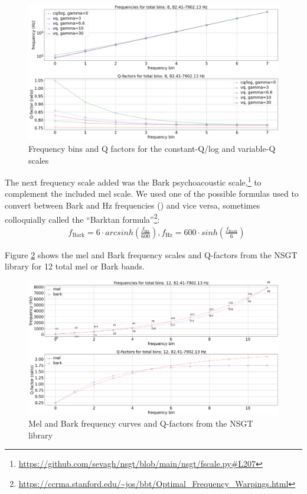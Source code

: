 \documentclass[report.tex]{subfiles}
\begin{document}
\begin{figure}[ht]
	\centering
	\includegraphics[width=\textwidth]{./images-freqscales/vqlog.png}
	\caption{Frequency bins and Q factors for the constant-Q/log and variable-Q scales}
	\label{fig:vq}
\end{figure}

The next frequency scale added was the Bark psychoacoustic scale,\footnote{\url{https://github.com/sevagh/nsgt/blob/main/nsgt/fscale.py\#L207}} to complement the included mel scale. We used one of the possible formulas used to convert between Bark and Hz frequencies (\cite{barktan}) and vice versa, sometimes colloquially called the ``Barktan formula''\footnote{\url{https://ccrma.stanford.edu/~jos/bbt/Optimal_Frequency_Warpings.html}}:
\begin{align}
	\nonumber & f_{\text{Bark}} = 6 \cdot arcsinh(\frac{f_{\text{Hz}}}{600}), f_{\text{Hz}} = 600 \cdot sinh(\frac{f_{\text{Bark}}}{6})
\end{align}

Figure \ref{fig:melbarkfsandqs} shows the mel and Bark frequency scales and Q-factors from the NSGT library for 12 total mel or Bark bands.

\begin{figure}[ht]
	\centering
	\includegraphics[width=\textwidth]{./images-freqscales/melbarkpitchesqs.png}
	\caption{Mel and Bark frequency curves and Q-factors from the NSGT library}
	\label{fig:melbarkfsandqs}
\end{figure}
\end{document}
